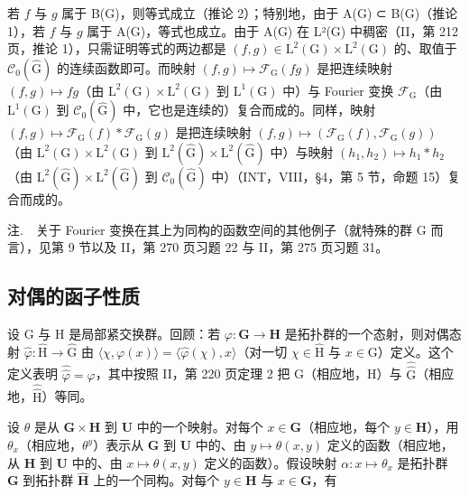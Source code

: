 若 \(f\) 与 \(g\) 属于 B(G)，则等式成立（推论 2）；特别地，由于 A(G) ⊂ B(G)（推论 1），若 \(f\) 与 \(g\) 属于 A(G)，等式也成立。由于 A(G) 在 L²(G) 中稠密（II，第 212 页，推论 1），只需证明等式的两边都是 \((f,g)\in\mathrm{L}^{2}(\mathrm{G})\times\mathrm{L}^{2}(\mathrm{G})\) 的、取值于 \(\mathcal{C}_{0}(\widehat{\mathrm{G}})\) 的连续函数即可。而映射 \((f,g)\mapsto\mathcal{F}_{\mathrm{G}}(fg)\) 是把连续映射 \((f,g)\mapsto fg\)（由 \(\mathrm{L}^{2}(\mathrm{G})\times\mathrm{L}^{2}(\mathrm{G})\) 到 \(\mathrm{L}^{1}(\mathrm{G})\) 中）与 Fourier 变换 \(\mathcal{F}_{\mathrm{G}}\)（由 \(\mathrm{L}^{1}(\mathrm{G})\) 到 \(\mathcal{C}_{0}(\widehat{\mathrm{G}})\) 中，它也是连续的）复合而成的。同样，映射 \((f,g)\mapsto\mathcal{F}_{\mathrm{G}}(f)*\mathcal{F}_{\mathrm{G}}(g)\) 是把连续映射 \((f,g)\mapsto(\mathcal{F}_{\mathrm{G}}(f),\mathcal{F}_{\mathrm{G}}(g))\)（由 \(\mathrm{L}^{2}(\mathrm{G})\times\mathrm{L}^{2}(\mathrm{G})\) 到 \(\mathrm{L}^{2}(\widehat{\mathrm{G}})\times\mathrm{L}^{2}(\widehat{\mathrm{G}})\) 中）与映射 \((h_{1},h_{2})\mapsto h_{1}*h_{2}\)（由 \(\mathrm{L}^{2}(\widehat{\mathrm{G}})\times\mathrm{L}^{2}(\widehat{\mathrm{G}})\) 到 \(\mathcal{C}_{0}(\widehat{\mathrm{G}})\) 中）（INT，VIII，§4，第 5 节，命题 15）复合而成的。

注.　关于 Fourier 变换在其上为同构的函数空间的其他例子（就特殊的群 G 而言），见第 9 节以及 II，第 270 页习题 22 与 II，第 275 页习题 31。

\subsection{对偶的函子性质}

设 G 与 H 是局部紧交换群。回顾：若 \(\varphi\colon\mathbf{G}\to\mathbf{H}\) 是拓扑群的一个态射，则对偶态射 \(\widehat{\varphi}\colon\widehat{\mathrm{H}}\to\widehat{\mathrm{G}}\) 由 \(\langle\chi,\varphi(x)\rangle=\langle\widehat{\varphi}(\chi),x\rangle\)（对一切 \(\chi\in\widehat{\mathrm{H}}\) 与 \(x\in\mathrm{G}\)）定义。这个定义表明 \(\widehat{\widehat{\varphi}}=\varphi\)，其中按照 II，第 220 页定理 2 把 G（相应地，H）与 \(\widehat{\widehat{\mathrm{G}}}\)（相应地，\(\widehat{\widehat{\mathrm{H}}}\)）等同。

设 \(\theta\) 是从 \(\mathbf{G} \times \mathbf{H}\) 到 \(\mathbf{U}\) 中的一个映射。对每个 \(x \in \mathbf{G}\)（相应地，每个 \(y \in \mathbf{H}\)），用 \(\theta_x\)（相应地，\(\theta^y\)）表示从 \(\mathbf{G}\) 到 \(\mathbf{U}\) 中的、由 \(y \mapsto \theta(x, y)\) 定义的函数（相应地，从 \(\mathbf{H}\) 到 \(\mathbf{U}\) 中的、由 \(x \mapsto \theta(x, y)\) 定义的函数）。假设映射 \(\alpha: x \mapsto \theta_x\) 是拓扑群 \(\mathbf{G}\) 到拓扑群 \(\widehat{\mathbf{H}}\) 上的一个同构。对每个 \(y \in \mathbf{H}\) 与 \(x \in \mathbf{G}\)，有

